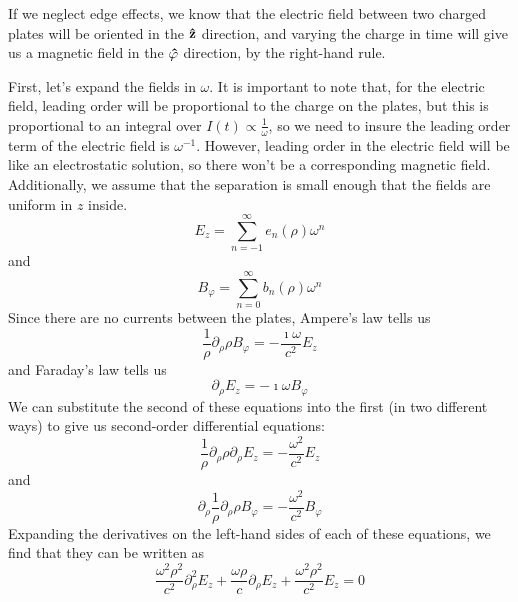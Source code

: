 \documentclass[a4paper,twoside]{article}
\begin{document}
\begin{problem}
    If we neglect edge effects, we know that the electric field between two charged plates will be oriented in the $ \vu{z} $ direction, and varying the charge in time will give us a magnetic field in the $ \vu{\varphi} $ direction, by the right-hand rule.

    First, let's expand the fields in $ \omega $. It is important to note that, for the electric field, leading order will be proportional to the charge on the plates, but this is proportional to an integral over $ I(t) \propto \frac{1}{\omega} $, so we need to insure the leading order term of the electric field is $ \omega^{-1} $. However, leading order in the electric field will be like an electrostatic solution, so there won't be a corresponding magnetic field. Additionally, we assume that the separation is small enough that the fields are uniform in $ z $ inside.
    \begin{equation}
        E_z = \sum_{n=-1}^{\infty} e_n(\rho) \omega^n
    \end{equation}
    and
    \begin{equation}
        B_{\varphi} = \sum_{n=0}^{\infty} b_n(\rho) \omega^n
    \end{equation}
    Since there are no currents between the plates, Ampere's law tells us
    \begin{equation}
        \frac{1}{\rho} \partial_{\rho} \rho B_{\varphi} = - \frac{\imath \omega}{c^2} E_z
    \end{equation}
    and Faraday's law tells us
    \begin{equation}
        \partial_{\rho} E_z = - \imath \omega B_{\varphi}
    \end{equation}
    We can substitute the second of these equations into the first (in two different ways) to give us second-order differential equations:
    \begin{equation}
        \frac{1}{\rho} \partial_{\rho} \rho \partial_{\rho} E_z = - \frac{\omega^2}{c^2} E_z
    \end{equation}
    and
    \begin{equation}
        \partial_{\rho} \frac{1}{\rho} \partial_{\rho} \rho B_{\varphi} = - \frac{\omega^2}{c^2} B_{\varphi}
    \end{equation}
    Expanding the derivatives on the left-hand sides of each of these equations, we find that they can be written as
    \begin{equation}
        \frac{\omega^2 \rho^2}{c^2} \partial^2_{\rho} E_z + \frac{\omega \rho}{c} \partial_{\rho} E_z + \frac{\omega^2 \rho^2}{c^2} E_z = 0

\end{equation}
\end{problem}
\end{document}
